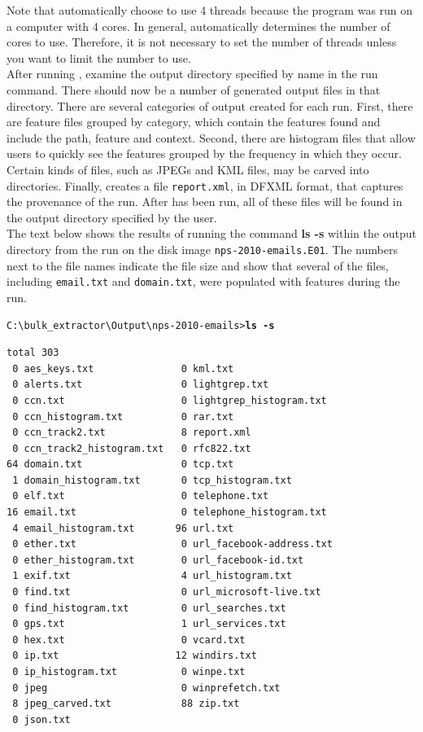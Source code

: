 \documentclass[11pt]{article} %
\begin{document}
Note that \bulk automatically choose to use 4 threads because the program was run on a computer with 4 cores. In general, \bulk automatically determines the number of cores to use. Therefore, it is not necessary to set the number of threads unless you want to limit the number to use.\\

After running \bulk, examine the output directory specified by name in the run command. There should now be a number of generated output files in that directory. There are several categories of output created for each \bulk run. First, there are feature files grouped by category, which contain the features found and include the path, feature and context. Second, there are histogram files that allow users to quickly see the features grouped by the frequency in which they occur. Certain kinds of files, such as JPEGs and KML files, may be carved into directories. Finally, \bulk creates a file \texttt{report.xml}, in DFXML format, that captures the provenance of the run. After \bulk has been run, all of these files will be found in the output directory specified by the user.\\

The text below shows the results of running the command \textbf{ls -s} within the output directory from the \bulk run on the disk image \texttt{nps-2010-emails.E01}. The numbers next to the file names indicate the file size and show that several of the files, including \texttt{email.txt} and \texttt{domain.txt}, were populated with features during the run.

\begingroup
\footnotesize
\texttt{C:\textbackslash bulk\_extractor\textbackslash Output\textbackslash nps-2010-emails\textgreater \textbf{ls -s}}
\endgroup
\begingroup
\footnotesize
\begin{Verbatim}[fontfamily=courier]
total 303
 0 aes_keys.txt               0 kml.txt
 0 alerts.txt                 0 lightgrep.txt
 0 ccn.txt                    0 lightgrep_histogram.txt
 0 ccn_histogram.txt          0 rar.txt
 0 ccn_track2.txt             8 report.xml
 0 ccn_track2_histogram.txt   0 rfc822.txt
64 domain.txt                 0 tcp.txt
 1 domain_histogram.txt       0 tcp_histogram.txt
 0 elf.txt                    0 telephone.txt
16 email.txt                  0 telephone_histogram.txt
 4 email_histogram.txt       96 url.txt
 0 ether.txt                  0 url_facebook-address.txt
 0 ether_histogram.txt        0 url_facebook-id.txt
 1 exif.txt                   4 url_histogram.txt
 0 find.txt                   0 url_microsoft-live.txt
 0 find_histogram.txt         0 url_searches.txt
 0 gps.txt                    1 url_services.txt
 0 hex.txt                    0 vcard.txt
 0 ip.txt                    12 windirs.txt
 0 ip_histogram.txt           0 winpe.txt
 0 jpeg                       0 winprefetch.txt
 8 jpeg_carved.txt            88 zip.txt
 0 json.txt
\end{Verbatim}
\endgroup
\end{document}
